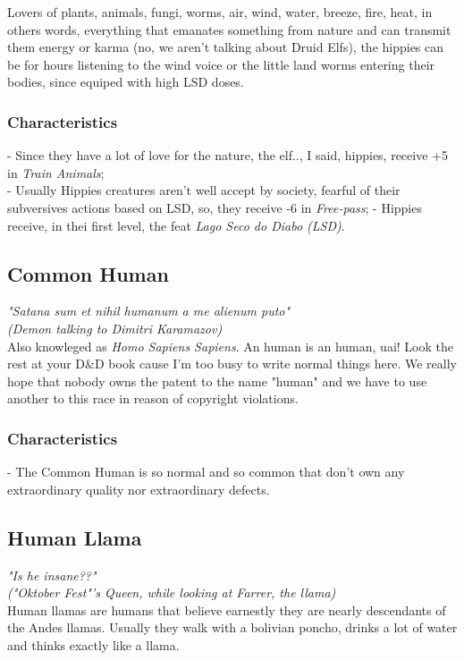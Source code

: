 \documentclass[ letterpaper,12pt]{article}
\begin{document}
Lovers of plants, animals, fungi, worms, air, wind, water, breeze, fire, heat, in others words, everything that emanates something from nature and can transmit them energy or karma (no, we aren't talking about Druid Elfs), the hippies can be for hours listening to the wind voice or the little land worms entering their bodies, since equiped with high LSD doses.\\

\subsubsection{Characteristics}
- Since they have a lot of love for the nature, the elf.., I said, hippies, receive +5 in {\it Train Animals};\\
- Usually Hippies creatures aren't well accept by society, fearful of their subversives actions based on LSD, so, they receive -6 in {\it Free-pass};
- Hippies receive, in thei first level, the feat {\it Lago Seco do Diabo (LSD)}.

\subsection{Common Human}
{\it "Satana sum et nihil humanum a me alienum puto"\\
 (Demon talking to Dimitri Karamazov)}\\

Also knowleged as {\it Homo Sapiens Sapiens}. An human is an human, uai! Look the rest at your D\&D book cause I'm too busy to write normal things here. We really hope that nobody owns the patent to the name "human" and we have to use another to this race in reason of copyright violations.

\subsubsection{Characteristics}
- The Common Human is so normal and so common that don't own any extraordinary quality nor extraordinary defects.

\subsection{Human Llama}
{\it "Is he insane??"\\
("Oktober Fest"'s Queen, while looking at Farrer, the llama)}\\

Human llamas are humans that believe earnestly they are nearly descendants of the Andes llamas. Usually they walk with a bolivian poncho, drinks a lot of water and thinks exactly like a llama.
\end{document}
